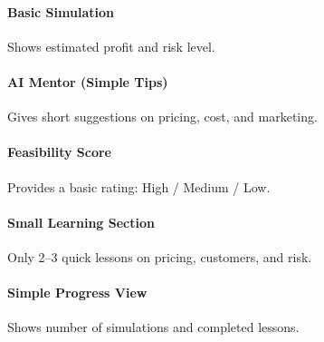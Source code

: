 \documentclass[12pt,letterpaper]{article}
\begin{document}
\paragraph{Basic Simulation}
Shows estimated profit and risk level.

\paragraph{AI Mentor (Simple Tips)}
Gives short suggestions on pricing, cost, and marketing.

\paragraph{Feasibility Score}
Provides a basic rating: High / Medium / Low.

\paragraph{Small Learning Section}
Only 2–3 quick lessons on pricing, customers, and risk.

\paragraph{Simple Progress View}
Shows number of simulations and completed lessons.
\end{document}
